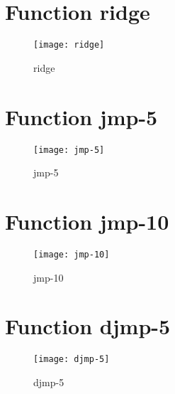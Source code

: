 \section{Function ridge}
\begin{center}

\end{center}
\begin{center}

\end{center}
\begin{figure}[h]
\centering
\begin{center}
\texttt{[image: ridge]}
\caption{ridge}
\end{center}
\end{figure}
\newpage
\section{Function jmp-5}
\begin{center}

\end{center}
\begin{center}

\end{center}
\begin{figure}[h]
\centering
\begin{center}
\texttt{[image: jmp-5]}
\caption{jmp-5}
\end{center}
\end{figure}
\newpage
\section{Function jmp-10}
\begin{center}

\end{center}
\begin{center}

\end{center}
\begin{figure}[h]
\centering
\begin{center}
\texttt{[image: jmp-10]}
\caption{jmp-10}
\end{center}
\end{figure}
\newpage
\section{Function djmp-5}
\begin{center}

\end{center}
\begin{center}

\end{center}
\begin{figure}[h]
\centering
\begin{center}
\texttt{[image: djmp-5]}
\caption{djmp-5}
\end{center}
\end{figure}
\newpage

